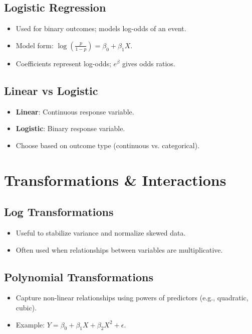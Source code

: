 \documentclass[10pt, landscape]{article}
\begin{document}
\begin{multicols}{3}
\subsection{Logistic Regression}
\begin{itemize}[noitemsep]
    \item Used for binary outcomes; models log-odds of an event.
    \item Model form: \( \log\left(\frac{p}{1-p}\right) = \beta_0 + \beta_1 X \).
    \item Coefficients represent log-odds; \(e^{\beta}\) gives odds ratios.
\end{itemize}

\subsection{Linear vs Logistic}
\begin{itemize}[noitemsep]
    \item \textbf{Linear}: Continuous response variable.
    \item \textbf{Logistic}: Binary response variable.
    \item Choose based on outcome type (continuous vs. categorical).
\end{itemize}

\section{Transformations \& Interactions}

\subsection{Log Transformations}
\begin{itemize}[noitemsep]
    \item Useful to stabilize variance and normalize skewed data.
    \item Often used when relationships between variables are multiplicative.
\end{itemize}

\subsection{Polynomial Transformations}
\begin{itemize}[noitemsep]
    \item Capture non-linear relationships using powers of predictors (e.g., quadratic, cubic).
    \item Example: \( Y = \beta_0 + \beta_1X + \beta_2X^2 + \epsilon \).
\end{itemize}


\end{multicols}
\end{document}

